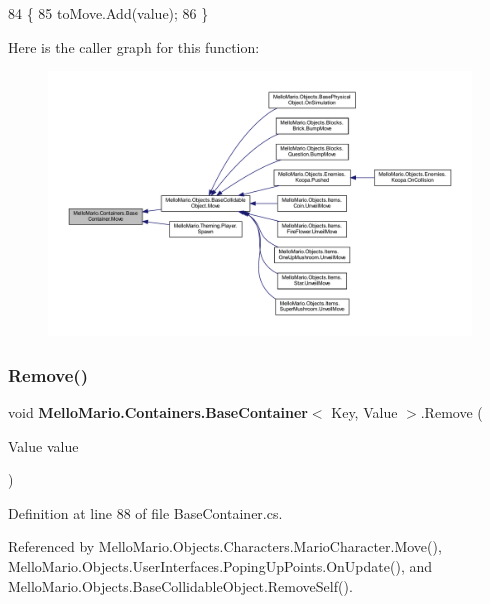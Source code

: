 \begin{DoxyCode}
84         \{
85             toMove.Add(value);
86         \}
\end{DoxyCode}
Here is the caller graph for this function\+:
\nopagebreak
\begin{figure}[H]
\begin{center}
\leavevmode
\includegraphics[width=350pt]{classMelloMario_1_1Containers_1_1BaseContainer_a2530ad4f8d59f78dccd177bc8007075f_icgraph}
\end{center}
\end{figure}
\mbox{\label{classMelloMario_1_1Containers_1_1BaseContainer_a22d1d351d72889669184260796158208}} 
\subsubsection{Remove()}
{\footnotesize\ttfamily void \textbf{ Mello\+Mario.\+Containers.\+Base\+Container}$<$ Key, Value $>$.Remove (\begin{DoxyParamCaption}\item[{Value}]{value }\end{DoxyParamCaption})}



Definition at line 88 of file Base\+Container.\+cs.



Referenced by Mello\+Mario.\+Objects.\+Characters.\+Mario\+Character.\+Move(), Mello\+Mario.\+Objects.\+User\+Interfaces.\+Poping\+Up\+Points.\+On\+Update(), and Mello\+Mario.\+Objects.\+Base\+Collidable\+Object.\+Remove\+Self().



